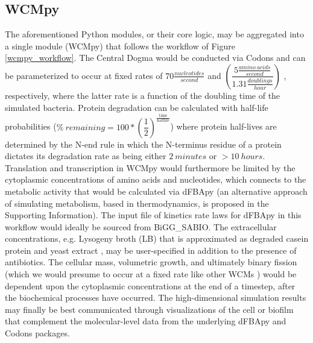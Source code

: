 \subsection{WCMpy}
The aforementioned Python modules, or their core logic, may be aggregated into a single module (WCMpy) that follows the workflow of Figure \ref{wcmpy_workflow}. The Central Dogma would be conducted via Codons and can be parameterized to occur at fixed rates of $70 \frac{nucleotides}{second}$ \cite{Dennis2009VaryingColi,Vogel1995EffectsColi} and $\left(\dfrac{5 \frac{amino~acids}{second}}{1.31 \frac{doublings}{hour}}\right)$ \cite{Young1976PolypeptideRate}, respectively, where the latter rate is a function of the doubling time of the simulated bacteria. Protein degradation can be calculated with half-life probabilities ($\% ~remaining = 100*\left(\dfrac{1}{2}\right)^{\frac{\text{time}}{\text{halflife}}}$) where protein half-lives are determined by the N-end rule \cite{Tobias1991TheBacteria} in which the N-terminus residue of a protein dictates its degradation rate as being either $2~minutes$ or $>10~hours$. Translation and transcription in WCMpy would furthermore be limited by the cytoplasmic concentrations of amino acids and nucleotides, which connects to the metabolic activity that would be calculated via dFBApy (an alternative approach of simulating metabolism, based in thermodynamics, is proposed in the Supporting Information). The input file of kinetics rate laws for dFBApy in this workflow would ideally be sourced from BiGG\_SABIO. The extracellular concentrations, e.g. Lysogeny broth (LB) \cite{LysogenyBroth} that is approximated as degraded casein protein \cite{Jolles1962AminoPara--casein} and yeast extract \cite{YeastSpread}, may be user-specified in addition to the presence of antibiotics. The cellular mass, volumetric growth, and ultimately binary fission \cite{Donachie1968RelationshipReplication} (which we would presume to occur at a fixed rate like other WCMs \cite{Karr2012}) would be dependent upon the cytoplasmic concentrations at the end of a timestep, after the biochemical processes have occurred. The high-dimensional simulation results may finally be best communicated through visualizations of the cell or biofilm that complement the molecular-level data from the underlying dFBApy and Codons packages. 

